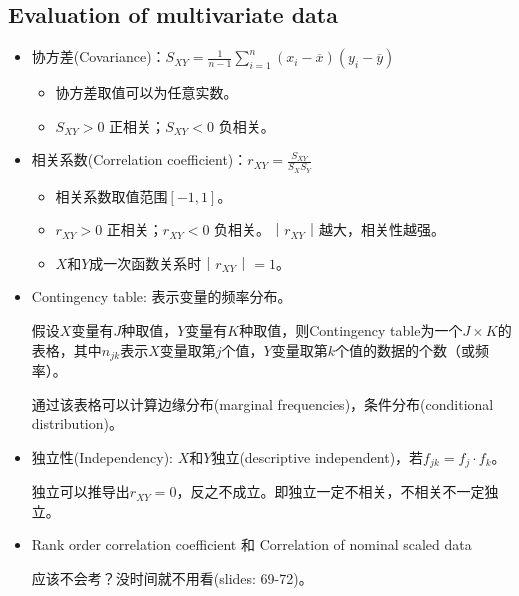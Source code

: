 \documentclass[12pt, a4paper, oneside]{ctexart}
\begin{document}
\subsection{Evaluation of multivariate data}
\begin{itemize}
    \item 协方差(Covariance)：$S_{XY}=\frac{1}{n-1}\sum_{i=1}^n(x_i-\overline{x} )(y_i-\overline{y} )$
    \begin{itemize}
        \item 协方差取值可以为任意实数。
        \item $S_{XY}>0$ 正相关；$S_{XY}<0$ 负相关。
    \end{itemize}
    \item 相关系数(Correlation coefficient)：$r_{XY}=\frac{S_{XY}}{S_XS_Y}$
    \begin{itemize}
        \item 相关系数取值范围$[-1,1]$。
        \item $r_{XY}>0$ 正相关；$r_{XY}<0$ 负相关。$｜r_{XY}｜$越大，相关性越强。
        \item $X$和$Y$成一次函数关系时$｜r_{XY}｜=1$。
    \end{itemize}
    \item Contingency table: 表示变量的频率分布。
    
    假设$X$变量有$J$种取值，$Y$变量有$K$种取值，则Contingency table为一个$J \times K$的表格，其中$n_{jk}$表示$X$变量取第$j$个值，$Y$变量取第$k$个值的数据的个数（或频率）。
    
    通过该表格可以计算边缘分布(marginal frequencies)，条件分布(conditional distribution)。
    \item 独立性(Independency): $X$和$Y$独立(descriptive independent)，若$f_{jk}=f_j \cdot f_k$。
    \begin{tcolorbox}
        独立可以推导出$r_{XY}=0$，反之不成立。即独立一定不相关，不相关不一定独立。
    \end{tcolorbox}
    \item Rank order correlation coefficient 和 Correlation of nominal scaled data 
    
    应该不会考？没时间就不用看(slides: 69-72)。
\end{itemize}
\end{document}
